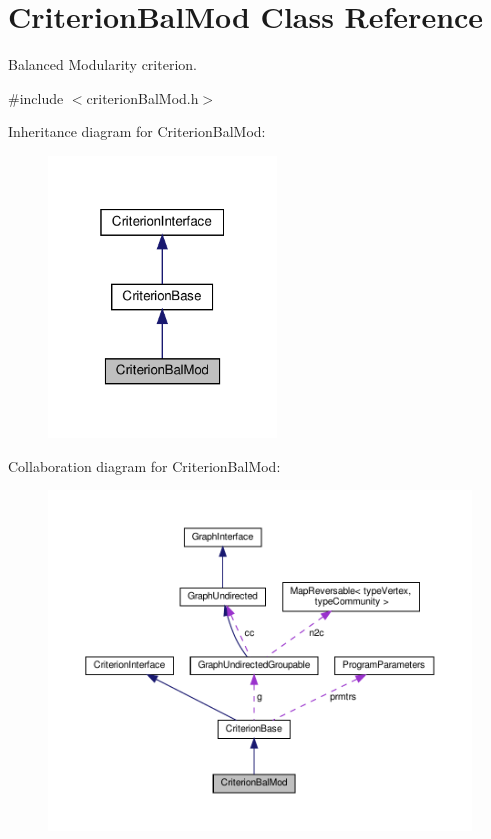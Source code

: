 \hypertarget{classCriterionBalMod}{}\section{Criterion\+Bal\+Mod Class Reference}
\label{classCriterionBalMod}


Balanced Modularity criterion.  




{\ttfamily \#include $<$criterion\+Bal\+Mod.\+h$>$}



Inheritance diagram for Criterion\+Bal\+Mod\+:
\nopagebreak
\begin{figure}[H]
\begin{center}
\leavevmode
\includegraphics[width=172pt]{classCriterionBalMod__inherit__graph}
\end{center}
\end{figure}


Collaboration diagram for Criterion\+Bal\+Mod\+:
\nopagebreak
\begin{figure}[H]
\begin{center}
\leavevmode
\includegraphics[width=350pt]{classCriterionBalMod__coll__graph}
\end{center}
\end{figure}
